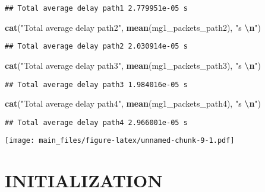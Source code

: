 \documentclass[
]{article}
\newenvironment{Shaded}{\begin{snugshade}}{\end{snugshade}}
\newcommand{\FunctionTok}[1]{\textcolor[rgb]{0.13,0.29,0.53}{\textbf{#1}}}
\newcommand{\NormalTok}[1]{#1}
\newcommand{\SpecialCharTok}[1]{\textcolor[rgb]{0.81,0.36,0.00}{\textbf{#1}}}
\newcommand{\StringTok}[1]{\textcolor[rgb]{0.31,0.60,0.02}{#1}}
\begin{document}
\begin{verbatim}
## Total average delay path1 2.779951e-05 s
\end{verbatim}

\begin{Shaded}
\begin{Highlighting}[]
\FunctionTok{cat}\NormalTok{(}\StringTok{"Total average delay path2"}\NormalTok{, }\FunctionTok{mean}\NormalTok{(mg1\_packets\_path2), }\StringTok{"s }\SpecialCharTok{\textbackslash{}n}\StringTok{"}\NormalTok{)}
\end{Highlighting}
\end{Shaded}

\begin{verbatim}
## Total average delay path2 2.030914e-05 s
\end{verbatim}

\begin{Shaded}
\begin{Highlighting}[]
\FunctionTok{cat}\NormalTok{(}\StringTok{"Total average delay path3"}\NormalTok{, }\FunctionTok{mean}\NormalTok{(mg1\_packets\_path3), }\StringTok{"s }\SpecialCharTok{\textbackslash{}n}\StringTok{"}\NormalTok{)}
\end{Highlighting}
\end{Shaded}

\begin{verbatim}
## Total average delay path3 1.984016e-05 s
\end{verbatim}

\begin{Shaded}
\begin{Highlighting}[]
\FunctionTok{cat}\NormalTok{(}\StringTok{"Total average delay path4"}\NormalTok{, }\FunctionTok{mean}\NormalTok{(mg1\_packets\_path4), }\StringTok{"s }\SpecialCharTok{\textbackslash{}n}\StringTok{"}\NormalTok{)}
\end{Highlighting}
\end{Shaded}

\begin{verbatim}
## Total average delay path4 2.966001e-05 s
\end{verbatim}

\texttt{[image: main\_files/figure-latex/unnamed-chunk-9-1.pdf]}

\hypertarget{initialization}{%
\section{INITIALIZATION}\label{initialization}}
\end{document}
